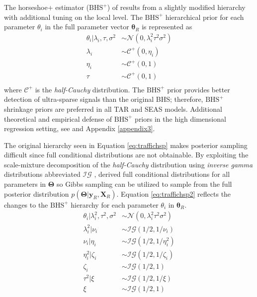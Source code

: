 The horseshoe+ estimator ($\textrm{BHS}^+$) of \cite{Bhadra2016} results from a slightly modified hierarchy with additional tuning on the local level. The $\textrm{BHS}^+$ hierarchical prior for each parameter $\theta_i$ in the full parameter vector $\bm{\theta}_R$ is represented as
\begin{equation}
\label{eq:traffichsp}
\begin{split}
	\theta_i|\lambda_i,\tau,\sigma^2 & \sim \mathcal{N}(0,\lambda^2_i\tau^2\sigma^2) \\
	\lambda_i &\sim \mathcal{C}^+(0,\eta_i)\\
	\eta_i & \sim \mathcal{C}^+(0,1)\\
	\tau &\sim \mathcal{C}^+(0,1)\\
\end{split}
\end{equation}
where $\mathcal{C}^+$ is the \textit{half-Cauchy} distribution. The $\textrm{BHS}^+$ prior provides better detection of ultra-sparse signals than the original BHS; therefore, $\textrm{BHS}^+$ shrinkage priors are preferred in all TAR and SEAS models.  Additional theoretical and empirical defense of $\textrm{BHS}^+$ priors in the high dimensional regression setting, see \cite{Bhadra2016} and Appendix \ref{appendix3}.

The original hierarchy seen in Equation \ref{eq:traffichsp} makes posterior sampling difficult since full conditional distributions are not obtainable. By exploiting the scale-mixture decomposition of the \textit{half-Cauchy} distribution using \textit{inverse gamma} distributions abbreviated $\mathcal{IG}$ \citep{Wand2011}, \cite{Makalic2016b} derived full conditional distributions for all parameters in $\bm{\Theta}$ so Gibbs sampling \citep{Geman1987,Gelfand1990} can be utilized to sample from the full posterior distribution $p(\bm{\Theta}|\bm{y}_R,\bm{X}_R)$. Equation \ref{eq:traffichsp2} reflects the changes to the $\textrm{BHS}^+$ hierarchy for each parameter $\theta_i$ in $\bm{\theta}_R$.
\begin{equation}
\label{eq:traffichsp2}
\begin{split}
\theta_i|\lambda_i^2,\tau^2,\sigma^2 & \sim \mathcal{N}(0,\lambda_i^2\tau^2\sigma^2) \\
\lambda^2_i|\nu_i & \sim \mathcal{IG}(1/2,1/\nu_i)\\
\nu_i|\eta_i & \sim \mathcal{IG}(1/2,1/\eta^2_i) \\
\eta^2_i|\zeta_i & \sim \mathcal{IG}(1/2,1/\zeta_i) \\
\zeta_i & \sim \mathcal{IG}(1/2,1) \\
\tau^2|\xi & \sim \mathcal{IG}(1/2,1/\xi)\\
\xi & \sim \mathcal{IG}(1/2,1) \\
\end{split}
\end{equation}

